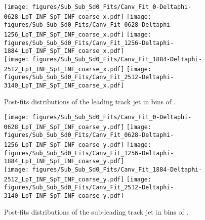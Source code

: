 \begin{figure}[htbp]
  \centering
 \texttt{[image: figures/Sub\_Sub\_Sd0\_Fits/Canv\_Fit\_0-Deltaphi-0628\_LpT\_INF\_SpT\_INF\_coarse\_x.pdf]}
 \texttt{[image: figures/Sub\_Sub\_Sd0\_Fits/Canv\_Fit\_0628-Deltaphi-1256\_LpT\_INF\_SpT\_INF\_coarse\_x.pdf]}
 \texttt{[image: figures/Sub\_Sub\_Sd0\_Fits/Canv\_Fit\_1256-Deltaphi-1884\_LpT\_INF\_SpT\_INF\_coarse\_x.pdf]}\\
 \texttt{[image: figures/Sub\_Sub\_Sd0\_Fits/Canv\_Fit\_1884-Deltaphi-2512\_LpT\_INF\_SpT\_INF\_coarse\_x.pdf]}
 \texttt{[image: figures/Sub\_Sub\_Sd0\_Fits/Canv\_Fit\_2512-Deltaphi-3140\_LpT\_INF\_SpT\_INF\_coarse\_x.pdf]}


\caption{Post-fits \subsdzero distributions of the leading track jet in bins of \dphi. }
  \label{fig:dphi-postfits-leading-subsub}
\end{figure}


\begin{figure}[htbp]
  \centering
 \texttt{[image: figures/Sub\_Sub\_Sd0\_Fits/Canv\_Fit\_0-Deltaphi-0628\_LpT\_INF\_SpT\_INF\_coarse\_y.pdf]}
 \texttt{[image: figures/Sub\_Sub\_Sd0\_Fits/Canv\_Fit\_0628-Deltaphi-1256\_LpT\_INF\_SpT\_INF\_coarse\_y.pdf]}
 \texttt{[image: figures/Sub\_Sub\_Sd0\_Fits/Canv\_Fit\_1256-Deltaphi-1884\_LpT\_INF\_SpT\_INF\_coarse\_y.pdf]}\\
 \texttt{[image: figures/Sub\_Sub\_Sd0\_Fits/Canv\_Fit\_1884-Deltaphi-2512\_LpT\_INF\_SpT\_INF\_coarse\_y.pdf]}
 \texttt{[image: figures/Sub\_Sub\_Sd0\_Fits/Canv\_Fit\_2512-Deltaphi-3140\_LpT\_INF\_SpT\_INF\_coarse\_y.pdf]}

\caption{Post-fits \subsdzero distributions of the sub-leading track jet in bins of \dphi. }
  \label{fig:dphi-postfits-subleading-subsub}
\end{figure}
